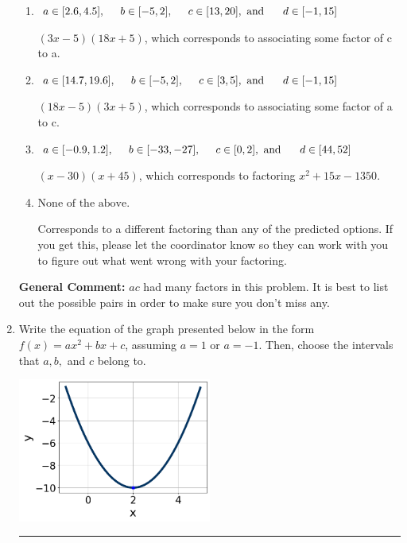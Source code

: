 \documentclass{extbook}[14pt]
\newcommand{\litem}[1]{\item #1

\rule{\textwidth}{0.4pt}}
\begin{document}
\begin{enumerate}
{\begin{enumerate}[label=\Alph*.]
* $(9x -5)(6x + 5)$, which is the correct option.
\item \( a \in [2.6, 4.5], \hspace*{5mm} b \in [-5, 2], \hspace*{5mm} c \in [13, 20], \text{ and } \hspace*{5mm} d \in [-1, 15] \)

 $(3x -5)(18x + 5)$, which corresponds to associating some factor of c to a.
\item \( a \in [14.7, 19.6], \hspace*{5mm} b \in [-5, 2], \hspace*{5mm} c \in [3, 5], \text{ and } \hspace*{5mm} d \in [-1, 15] \)

 $(18x -5)(3x + 5)$, which corresponds to associating some factor of a to c.
\item \( a \in [-0.9, 1.2], \hspace*{5mm} b \in [-33, -27], \hspace*{5mm} c \in [0, 2], \text{ and } \hspace*{5mm} d \in [44, 52] \)

 $(x -30)(x + 45)$, which corresponds to factoring $x^{2} +15 x -1350$.
\item \( \text{None of the above.} \)

 Corresponds to a different factoring than any of the predicted options. If you get this, please let the coordinator know so they can work with you to figure out what went wrong with your factoring.
\end{enumerate}

\textbf{General Comment:} $ac$ had many factors in this problem. It is best to list out the possible pairs in order to make sure you don't miss any.
}
\litem{
Write the equation of the graph presented below in the form $f(x)=ax^2+bx+c$, assuming  $a=1$ or $a=-1$. Then, choose the intervals that $a, b,$ and $c$ belong to.

\begin{center}
    \includegraphics[width=0.5\textwidth]{../Figures/quadraticGraphToEquationCopyB.png}
\end{center}


}
\end{enumerate}
\end{document}
